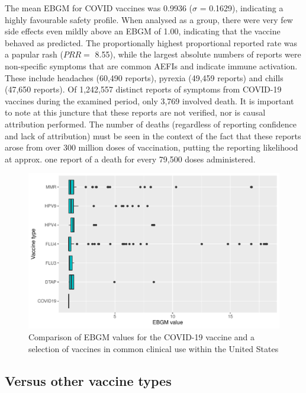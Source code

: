 \documentclass[12pt]{article}
\begin{document}
The mean EBGM for COVID vaccines was 0.9936 ($\sigma$ = 0.1629), indicating a highly favourable safety profile. When analysed as a group, there were very few side effects even mildly above an EBGM of 1.00, indicating that the vaccine behaved as predicted. The proportionally highest proportional reported rate was a papular rash ($PRR =$ 8.55), while the largest absolute numbers of reports were non-specific symptoms that are common AEFIs and indicate immune activation. These include headaches (60,490 reports), pyrexia (49,459 reports) and chills (47,650 reports). Of 1,242,557 distinct reports of symptoms from COVID-19 vaccines during the examined period, only 3,769 involved death. It is important to note at this juncture that these reports are not verified, nor is causal attribution performed. The number of deaths (regardless of reporting confidence and lack of attribution) must be seen in the context of the fact that these reports arose from over 300 million doses of vaccination, putting the reporting likelihood at approx. one report of a death for every 79,500 doses administered.

\begin{figure}
 \centering 
 \includegraphics[scale=0.7]{vs_other_vax}
 \caption{Comparison of EBGM values for the COVID-19 vaccine and a selection of vaccines in common clinical use within the United States}
 \label{fig:vs_other_vax}
\end{figure}


\subsection{Versus other vaccine types} %
\label{sub:versus_other_vaccine_types}
\end{document}
